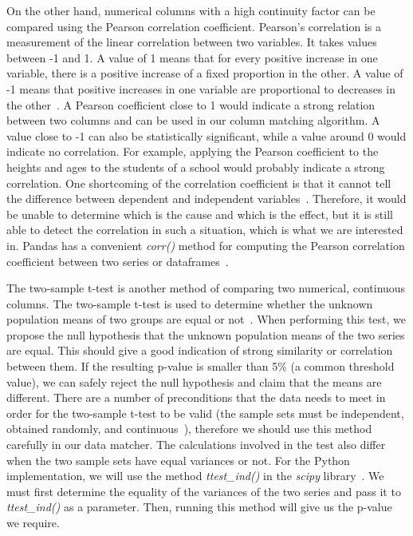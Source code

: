 On the other hand, numerical columns with a high continuity factor can be compared using the Pearson correlation
coefficient.
Pearson's correlation is a measurement of the linear correlation between two variables.
It takes values between -1 and 1.
A value of 1 means that for every positive increase in one variable, there is a positive increase of a fixed proportion
in the other.
A value of -1 means that positive increases in one variable are proportional to decreases
in the other~\cite{PearsonCorrelationCoefficient}.
A Pearson coefficient close to 1 would indicate a strong relation between two columns and can be used in our column
matching algorithm.
A value close to -1 can also be statistically significant, while a value around 0 would indicate no correlation.
For example, applying the Pearson coefficient to the heights and ages to the students of a school would probably indicate
a strong correlation.
One shortcoming of the correlation coefficient is that it cannot tell the difference between dependent and
independent variables~\cite{PearsonCorrelationCoefficient}.
Therefore, it would be unable to determine which is the cause and which is the effect, but it is still able to detect the
correlation in such a situation, which is what we are interested in.
Pandas has a convenient \textit{corr()} method for computing the Pearson correlation coefficient between two series or
dataframes~\cite{pandasCorr}.

The two-sample t-test is another method of comparing two numerical, continuous columns.
The two-sample t-test is used to determine whether the unknown population means of two groups are equal or not~\cite{twoSampleTTest}.
When performing this test, we propose the null hypothesis that the unknown population means of the two series are equal.
This should give a good indication of strong similarity or correlation between them.
If the resulting p-value is smaller than 5\% (a common threshold value), we can safely reject the null hypothesis and claim
that the means are different.
There are a number of preconditions that the data needs to meet in order for the two-sample t-test to be valid (the sample
sets must be independent, obtained randomly, and continuous~\cite{twoSampleTTest}), therefore we should use this method
carefully in our data matcher.
The calculations involved in the test also differ when the two sample sets have equal variances or not.
For the Python implementation, we will use the method \textit{ttest\_ind()} in the \textit{scipy} library~\cite{scipyTwoSampleTTestInd}.
We must first determine the equality of the variances of the two series and pass it to \textit{ttest\_ind()} as a parameter.
Then, running this method will give us the p-value we require.

